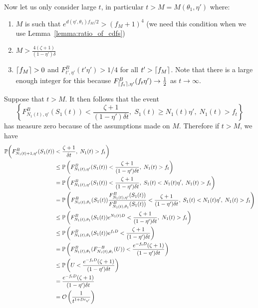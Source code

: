 \begin{myproof}[Proof.]
	Now let us only consider large $t$, in particular $t > M = M(\theta_1, \eta')$ where:
	\begin{enumerate}
		\item $M$ is such that $e^{d(\eta', \theta_1)f_{M}/2} > (f_M + 1)^4$ (we need this condition when we use Lemma~\ref{lemma:ratio_of_cdfs})
		\item $M > \frac{4(\zeta + 1)}{(1-\eta')\delta }$
		\item $\lceil f_M\rceil > 0$ and $F^B_{t',\eta'}(t' \eta') > 1/4$ for all $t' > \lceil f_M\rceil$. Note that there is a large enough integer for this because $F^B_{\lceil f_t\rceil,\eta'}(f_t \eta') \to \frac{1}{2}$ as $t \to \infty$.
	\end{enumerate} 
	Suppose that $t > M$. It then follows that the event \[\left\{F^B_{N_1(t), \eta'}(S_1(t)) < \frac{\zeta + 1}{(1-\eta')\delta t},\; S_1(t) \ge N_1(t) \eta', \; N_1(t) > f_t\right\}\] has measure zero because of the assumptions made on $M$. Therefore if $t > M$, we have
	\begin{align}
	\mathbb{P}\bigg(F^B_{N_1(t)+1,  \eta'}(S_1(t)) &< \frac{\zeta + 1}{\delta t }  , \; N_1(t) > f_t \bigg) \nonumber \\
	& \le \P{F^B_{N_1(t),  \eta'}(S_1(t)) < \frac{\zeta + 1}{(1-\eta')\delta t}, \; N_1(t) > f_t} \label{eqn:part1_decomp_the_cdf_of_y} \\ 
	& = \P{F^B_{N_1(t),  \eta'}(S_1(t)) < \frac{\zeta + 1}{(1-\eta')\delta t}, \; S_1(t) < N_1(t) \eta', \; N_1(t) > f_t} \nonumber \\ 
	& =  \P{F^B_{N_1(t),\theta_1}(S_1(t)) \frac{F^B_{N_1(t),\eta'}(S_1(t))}{F^B_{N_1(t),\theta_1}(S_1(t))} < \frac{\zeta + 1}{(1-\eta')\delta  t}, \;S_1(t) < N_1(t) \eta', \; N_1(t) > f_t} \nonumber \\
	& \le  \P{F_{N_1(t),\theta_1}^B(S_1(t))  e^{N_1(t) D} < \frac{\zeta + 1}{(1-\eta')\delta  t} , \; N_1(t) > f_t} \label{eqn:part1_app_of_lemma2} \\
	& \le  \P{F_{N_1(t),\theta_1}^B(S_1(t)) e^{f_t D} < \frac{\zeta + 1}{(1-\eta')\delta  t}} \nonumber \\
	& =  \P{F_{N_1(t),\theta_1}^B(F^{-B}_{N_1(t),\theta_1}(U)) < \frac{e^{-f_t D}(\zeta + 1)}{(1-\eta')\delta  t} } \label{eqn:part1_propert_of_inverse_sampling}\\
	& \le  \P{U < \frac{e^{-f_t D}(\zeta + 1)}{(1-\eta')\delta  t} } \nonumber \\  
	& =  \frac{e^{-f_t D}(\zeta + 1)}{(1-\eta')\delta  t} \nonumber  \nonumber\\
	& = \mathcal O\left( \frac{1}{t^{1+Dc_{\eta'}}} \right)  \label{bound:one_over_t_plus_eps} 

\end{align}
\end{myproof}
